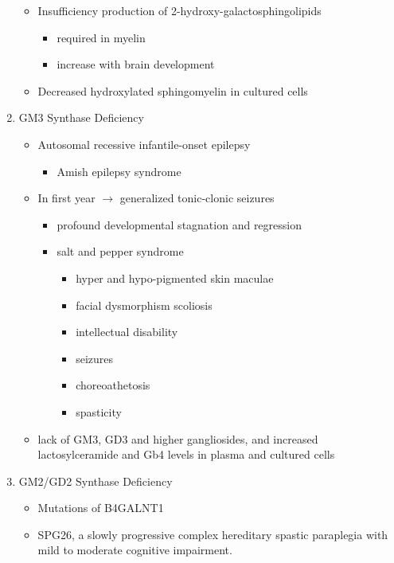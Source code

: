 \documentclass{scrartcl}
\begin{document}
\begin{enumerate}
\begin{itemize}
\item Insufficiency production of 2-hydroxy-galactosphingolipids
\begin{itemize}
\item required in myelin
\item increase with brain development
\end{itemize}

\item Decreased hydroxylated sphingomyelin in cultured cells
\end{itemize}

\item GM3 Synthase Deficiency
\label{sec:org0431244}

\begin{itemize}
\item Autosomal recessive infantile-onset epilepsy
\begin{itemize}
\item Amish epilepsy syndrome
\end{itemize}
\item In first year \(\to\) generalized tonic-clonic seizures
\begin{itemize}
\item profound developmental stagnation and regression
\item salt and pepper syndrome
\begin{itemize}
\item hyper and hypo-pigmented skin maculae
\item facial dysmorphism scoliosis
\item intellectual disability
\item seizures
\item choreoathetosis
\item spasticity
\end{itemize}
\end{itemize}

\item lack of GM3, GD3 and higher gangliosides, and increased
lactosylceramide and Gb4 levels in plasma and cultured cells
\end{itemize}

\item GM2/GD2 Synthase Deficiency
\label{sec:orgef23ff9}

\begin{itemize}
\item Mutations of B4GALNT1
\item SPG26, a slowly progressive complex hereditary spastic paraplegia
with mild to moderate cognitive impairment.


\end{itemize}
\end{enumerate}
\end{document}
